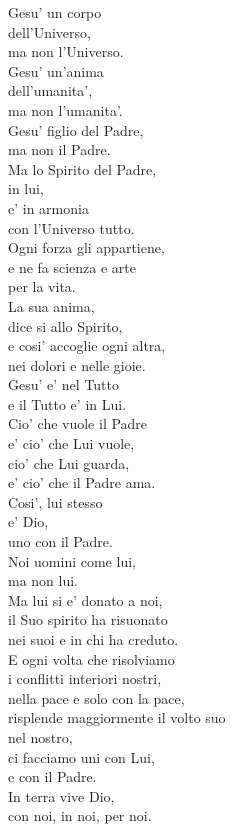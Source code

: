 \begin{haiku}
Gesu' un corpo \\
dell'Universo,\\
ma non l'Universo.\\
Gesu' un'anima\\
dell'umanita',\\
ma non l'umanita'.\\
Gesu' figlio del Padre,\\
ma non il Padre.\\
Ma lo Spirito del Padre,\\
in lui,\\
e' in armonia \\
con l'Universo tutto.\\
Ogni forza gli appartiene,\\
e ne fa scienza e arte\\
per la vita.\\
La sua anima,\\
dice si allo Spirito,\\
e cosi' accoglie ogni altra,\\
nei dolori e nelle gioie.\\
Gesu' e' nel Tutto \\
e il Tutto e' in Lui.\\
Cio' che vuole il Padre\\
e' cio' che Lui vuole,\\
cio' che Lui guarda,\\
e' cio' che il Padre ama.\\
Cosi', lui stesso \\
e' Dio,\\
uno con il Padre.\\
Noi uomini come lui,\\
ma non lui.\\
Ma lui si e' donato a noi,\\
il Suo spirito ha risuonato\\
nei suoi e in chi ha creduto.\\
E ogni volta che risolviamo \\
i conflitti interiori nostri,\\
nella pace e solo con la pace,\\
risplende maggiormente il volto suo\\
nel nostro,\\
ci facciamo uni con Lui,\\
e con il Padre.\\
In terra vive Dio,\\
con noi, in noi, per noi.\\
\end{haiku}

